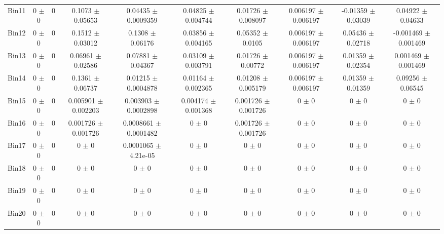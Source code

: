 \begin{tabular}{@{\extracolsep{4pt}}lccccccccc@{}}
     Bin11 & 0 $\pm$ 0 & 0 & 0.1073 $\pm$ 0.05653 & 0.04435 $\pm$ 0.0009359 & 0.04825 $\pm$ 0.004744 & 0.01726 $\pm$ 0.008097 & 0.006197 $\pm$ 0.006197 & -0.01359 $\pm$ 0.03039 & 0.04922 $\pm$ 0.04633 \\ 
     Bin12 & 0 $\pm$ 0 & 0 & 0.1512 $\pm$ 0.03012 & 0.1308 $\pm$ 0.06176 & 0.03856 $\pm$ 0.004165 & 0.05352 $\pm$ 0.0105 & 0.006197 $\pm$ 0.006197 & 0.05436 $\pm$ 0.02718 & -0.001469 $\pm$ 0.001469 \\ 
     Bin13 & 0 $\pm$ 0 & 0 & 0.06961 $\pm$ 0.02586 & 0.07881 $\pm$ 0.04367 & 0.03109 $\pm$ 0.003791 & 0.01726 $\pm$ 0.00772 & 0.006197 $\pm$ 0.006197 & 0.01359 $\pm$ 0.02354 & 0.001469 $\pm$ 0.001469 \\ 
     Bin14 & 0 $\pm$ 0 & 0 & 0.1361 $\pm$ 0.06737 & 0.01215 $\pm$ 0.0004878 & 0.01164 $\pm$ 0.002365 & 0.01208 $\pm$ 0.005179 & 0.006197 $\pm$ 0.006197 & 0.01359 $\pm$ 0.01359 & 0.09256 $\pm$ 0.06545 \\ 
     Bin15 & 0 $\pm$ 0 & 0 & 0.005901 $\pm$ 0.002203 & 0.003903 $\pm$ 0.0002898 & 0.004174 $\pm$ 0.001368 & 0.001726 $\pm$ 0.001726 & 0 $\pm$ 0 & 0 $\pm$ 0 & 0 $\pm$ 0 \\ 
     Bin16 & 0 $\pm$ 0 & 0 & 0.001726 $\pm$ 0.001726 & 0.0008661 $\pm$ 0.0001482 & 0 $\pm$ 0 & 0.001726 $\pm$ 0.001726 & 0 $\pm$ 0 & 0 $\pm$ 0 & 0 $\pm$ 0 \\ 
     Bin17 & 0 $\pm$ 0 & 0 & 0 $\pm$ 0 & 0.0001065 $\pm$ 4.21e-05 & 0 $\pm$ 0 & 0 $\pm$ 0 & 0 $\pm$ 0 & 0 $\pm$ 0 & 0 $\pm$ 0 \\ 
     Bin18 & 0 $\pm$ 0 & 0 & 0 $\pm$ 0 & 0 $\pm$ 0 & 0 $\pm$ 0 & 0 $\pm$ 0 & 0 $\pm$ 0 & 0 $\pm$ 0 & 0 $\pm$ 0 \\ 
     Bin19 & 0 $\pm$ 0 & 0 & 0 $\pm$ 0 & 0 $\pm$ 0 & 0 $\pm$ 0 & 0 $\pm$ 0 & 0 $\pm$ 0 & 0 $\pm$ 0 & 0 $\pm$ 0 \\ 
     Bin20 & 0 $\pm$ 0 & 0 & 0 $\pm$ 0 & 0 $\pm$ 0 & 0 $\pm$ 0 & 0 $\pm$ 0 & 0 $\pm$ 0 & 0 $\pm$ 0 & 0 $\pm$ 0 \\ 
\hline\hline
  \end{tabular}
